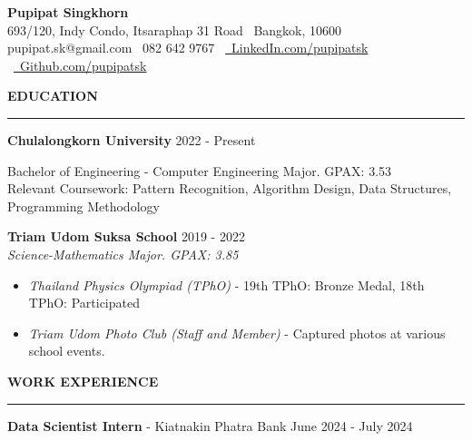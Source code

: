 \documentclass[11pt]{article}
\begin{document}
\begin{center}
    {\Large \textbf{Pupipat Singkhorn}}\\
    693/120, Indy Condo, Itsaraphap 31 Road \textbullet \ Bangkok, 10600 \\
    pupipat.sk@gmail.com \textbullet \ 082 642 9767 \textbullet\ \href{www.linkedin.com/in/pupipatsk}{\faLinkedin\ LinkedIn.com/pupipatsk} \textbullet\ \href{https://github.com/pupipatsk}{\faGithub\ Github.com/pupipatsk}
\end{center}
\textbf{EDUCATION}
\vspace{5pt}
{\color{NavyBlue}\hrule}
\vspace{6pt}

\textbf{Chulalongkorn University} \hfill 2022 - Present

\hspace*{7pt} Bachelor of Engineering - Computer Engineering Major. GPAX: 3.53\\
\hspace*{7pt} Relevant Coursework: Pattern Recognition, Algorithm Design, Data Structures, Programming Methodology

\vspace{2pt}

\textbf{Triam Udom Suksa School} \hfill 2019 - 2022\\
\textit{Science-Mathematics Major. GPAX: 3.85}

\begin{itemize}[noitemsep, topsep=0pt, partopsep=0pt, parsep=0pt]
    \item \textit{Thailand Physics Olympiad (TPhO)} - 19th TPhO: Bronze Medal, 18th TPhO: Participated
    \item \textit{Triam Udom Photo Club (Staff and Member)} - Captured photos at various school events.
\end{itemize}

\vspace{9pt}
\textbf{WORK EXPERIENCE}
\vspace{5pt}
{\color{NavyBlue}\hrule}
\vspace{6pt}

\textbf{Data Scientist Intern} - Kiatnakin Phatra Bank \hfill June 2024 - July 2024
\end{document}
